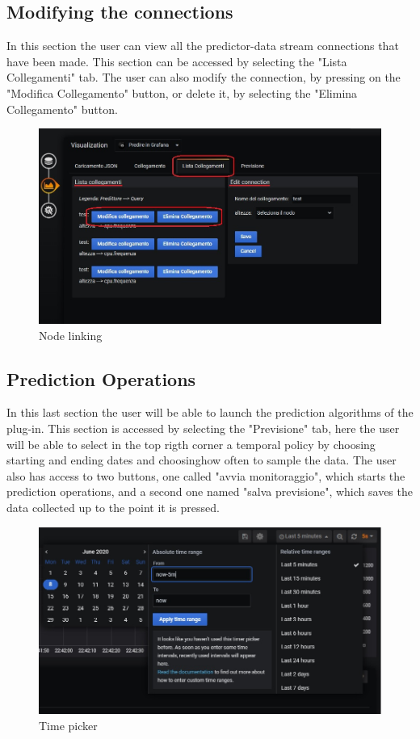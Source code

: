 \subsection{Modifying the connections}
In this section the user can view all the predictor-data stream connections that have been made. This section can be accessed by selecting the "Lista Collegamenti" tab.
The user can also modify the connection, by pressing on the "Modifica Collegamento" button, or delete it, by selecting the "Elimina Collegamento" button.

\begin{figure}[H]
\centering
\includegraphics[scale=0.75]{img/plug-in/collegamento_node.jpg}
\caption{Node linking}
\end{figure}


\subsection{Prediction Operations}
In this last section the user will be able to launch the prediction algorithms of the plug-in. This section is accessed by selecting the "Previsione" tab, here the user will be able to select in the top rigth corner a temporal policy by choosing starting and ending dates and choosinghow often to sample the data. The user  also has access to two buttons, one called "avvia monitoraggio", which starts the prediction operations, and a second one named "salva previsione", which saves the data collected up to the point it is pressed.

\begin{figure}[H]
\centering
\includegraphics[scale=0.95]{img/plug-in/time_selector.jpg}
\caption{Time picker}
\end{figure}


